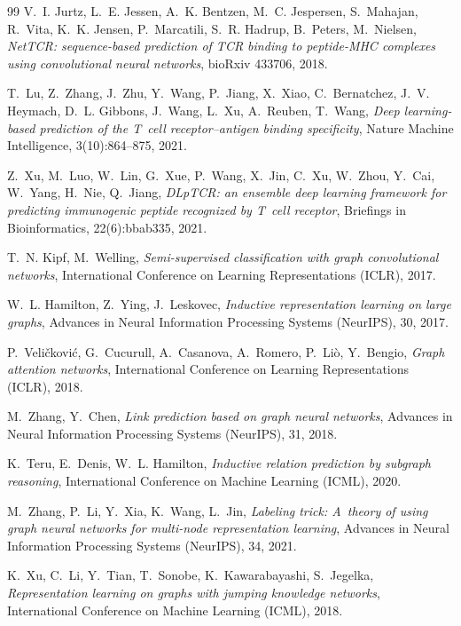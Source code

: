 \documentclass{SGGW-thesis}
\begin{document}
\begin{thebibliography}{99}
V.~I. Jurtz, L.~E. Jessen, A.~K. Bentzen, M.~C. Jespersen, S.~Mahajan, R.~Vita, K.~K. Jensen,
P.~Marcatili, S.~R. Hadrup, B.~Peters, M.~Nielsen,
\textit{NetTCR: sequence-based prediction of TCR binding to peptide-MHC complexes using
convolutional neural networks},
bioRxiv 433706, 2018.

T.~Lu, Z.~Zhang, J.~Zhu, Y.~Wang, P.~Jiang, X.~Xiao, C.~Bernatchez, J.~V. Heymach, D.~L. Gibbons,
J.~Wang, L.~Xu, A.~Reuben, T.~Wang,
\textit{Deep learning-based prediction of the T~cell receptor--antigen binding specificity},
Nature Machine Intelligence, 3(10):864--875, 2021.

Z.~Xu, M.~Luo, W.~Lin, G.~Xue, P.~Wang, X.~Jin, C.~Xu, W.~Zhou, Y.~Cai, W.~Yang, H.~Nie, Q.~Jiang,
\textit{DLpTCR: an ensemble deep learning framework for predicting immunogenic peptide recognized
by T~cell receptor},
Briefings in Bioinformatics, 22(6):bbab335, 2021.

T.~N. Kipf, M.~Welling,
\textit{Semi-supervised classification with graph convolutional networks},
International Conference on Learning Representations (ICLR), 2017.

W.~L. Hamilton, Z.~Ying, J.~Leskovec,
\textit{Inductive representation learning on large graphs},
Advances in Neural Information Processing Systems (NeurIPS), 30, 2017.

P.~Veli{\v{c}}kovi{\'c}, G.~Cucurull, A.~Casanova, A.~Romero, P.~Li{\`o}, Y.~Bengio,
\textit{Graph attention networks},
International Conference on Learning Representations (ICLR), 2018.

M.~Zhang, Y.~Chen,
\textit{Link prediction based on graph neural networks},
Advances in Neural Information Processing Systems (NeurIPS), 31, 2018.

K.~Teru, E.~Denis, W.~L. Hamilton,
\textit{Inductive relation prediction by subgraph reasoning},
International Conference on Machine Learning (ICML), 2020.

M.~Zhang, P.~Li, Y.~Xia, K.~Wang, L.~Jin,
\textit{Labeling trick: A~theory of using graph neural networks for multi-node representation learning},
Advances in Neural Information Processing Systems (NeurIPS), 34, 2021.

K.~Xu, C.~Li, Y.~Tian, T.~Sonobe, K.~Kawarabayashi, S.~Jegelka,
\textit{Representation learning on graphs with jumping knowledge networks},
International Conference on Machine Learning (ICML), 2018.


\end{thebibliography}
\end{document}
